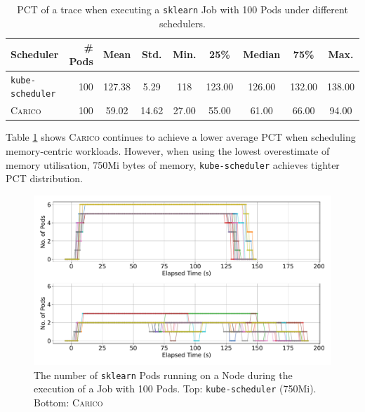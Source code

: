 \begin{table}[ht!]
\centering
    \begin{tabular}{|l|r|c|c|c|c|c|c|c|}
    \hline
        \bfseries Scheduler & \bfseries \# Pods & \bfseries Mean & \bfseries Std. &
        \bfseries Min. & \bfseries 25\% & \bfseries Median & \bfseries 75\% & \bfseries Max. \\
    \hline
        \texttt{kube-scheduler} & 100 & 127.38 & 5.29 & 118 & 123.00 & 126.00 & 132.00 &
        138.00 \\
        \textsc{Carico} & 100 & 59.02 & 14.62 & 27.00 & 55.00 & 61.00 & 66.00 & 94.00 \\
    \hline
    \end{tabular}
    \caption{PCT of a trace when executing a \texttt{sklearn} Job
    with 100 Pods under different schedulers.}
    \label{tab:mem-pod-completions}
\end{table}

Table \ref{tab:mem-pod-completions} shows \textsc{Carico} continues to achieve a
lower average PCT when scheduling memory-centric workloads.
However, when using the lowest overestimate of memory utilisation, 750Mi bytes
of memory, \texttt{kube-scheduler} achieves tighter PCT distribution.

\begin{figure}[ht!]
    \centering
    \includegraphics[width=\textwidth]{images/ml-running-pods.pdf}
    \caption{The number of \texttt{sklearn} Pods running on a Node during the
    execution of a Job with 100 Pods. Top: \texttt{kube-scheduler} (750Mi).
    Bottom: \textsc{Carico}}
    \label{fig:ml-pod-running}
\end{figure}


